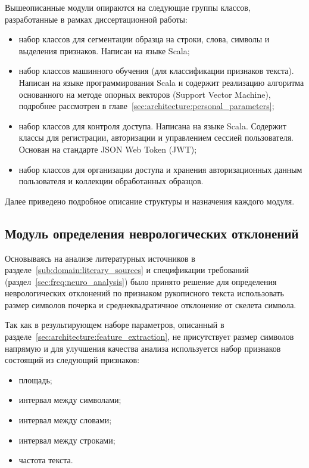 Вышеописанные модули опираются на следующие группы классов, разработанные в рамках диссертационной работы:
\begin{itemize}
    \item набор классов для сегментации образца на строки, слова, символы и выделения признаков. Написан на языке Scala;
    \item набор классов машинного обучения (для классификации признаков текста). Написан на языке программирования Scala и содержит реализацию алгоритма основанного на методе опорных векторов (Support Vector Machine), подробнее рассмотрен в главе~\ref{sec:architecture:personal_parameters};
    \item набор классов для контроля доступа. Написана на языке Scala. Содержит классы для регистрации, авторизации и управлением сессией пользователя. Основан на стандарте JSON Web Token (JWT);
    \item набор классов для организации доступа и хранения авторизационных данным пользователя и коллекции обработанных образцов.
\end{itemize}

Далее приведено подробное описание структуры и назначения каждого модуля.
\subsection{Модуль определения неврологических отклонений}
\label{sec:architecture:neuro_ill}
Основываясь на анализе литературных источников в разделе~\ref{sub:domain:literary_sources} и спецификации требований (раздел~\ref{sec:freq:neuro_analysis}) было принято решение для определения неврологических отклонений по признаком рукописного текста использовать размер символов почерка и среднеквадратичное отклонение от скелета символа.

Так как в результирующем наборе параметров, описанный в разделе~\ref{sec:architecture:feature_extraction}, не присутствует размер символов напрямую и для улучшения качества анализа используется набор признаков состоящий из
следующий признаков:
\begin{itemize}
  \item площадь;
  \item интервал между символами;
  \item интервал между словами;
  \item интервал между строками;
  \item частота текста.
\end{itemize}

